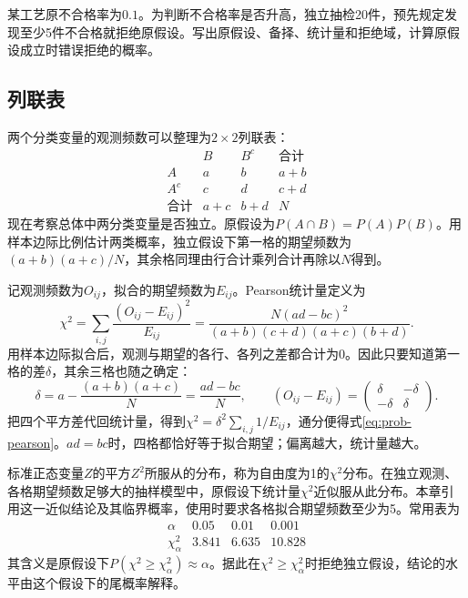 \begin{example}
某工艺原不合格率为\(0.1\)。为判断不合格率是否升高，独立抽检20件，预先规定发现至少5件不合格就拒绝原假设。写出原假设、备择、统计量和拒绝域，计算原假设成立时错误拒绝的概率。
\end{example}

\subsection{列联表}

两个分类变量的观测频数可以整理为\(2\times2\)列联表：
\[
\begin{array}{c|cc|c}
 & B&B^c&\text{合计}\\\hline
 A&a&b&a+b\\
 A^c&c&d&c+d\\\hline
 \text{合计}&a+c&b+d&N
\end{array}
\]
现在考察总体中两分类变量是否独立。原假设为\(P(A\cap B)=P(A)P(B)\)。用样本边际比例估计两类概率，独立假设下第一格的期望频数为\((a+b)(a+c)/N\)，其余格同理由行合计乘列合计再除以\(N\)得到。

记观测频数为\(O_{ij}\)，拟合的期望频数为\(E_{ij}\)。{\heiti Pearson统计量}定义为
\begin{equation}\label{eq:prob-pearson}
 \chi^2=\sum_{i,j}\frac{(O_{ij}-E_{ij})^2}{E_{ij}}
 =\frac{N(ad-bc)^2}{(a+b)(c+d)(a+c)(b+d)}.
\end{equation}
用样本边际拟合后，观测与期望的各行、各列之差都合计为0。因此只要知道第一格的差\(\delta\)，其余三格也随之确定：
\[
 \delta=a-\frac{(a+b)(a+c)}N=\frac{ad-bc}N,
 \qquad (O_{ij}-E_{ij})=
 \begin{pmatrix}\delta&-\delta\\-\delta&\delta\end{pmatrix}.
\]
把四个平方差代回统计量，得到\(\chi^2=\delta^2\sum_{i,j}1/E_{ij}\)，通分便得式\eqref{eq:prob-pearson}。\(ad=bc\)时，四格都恰好等于拟合期望；偏离越大，统计量越大。

标准正态变量\(Z\)的平方\(Z^2\)所服从的分布，称为自由度为1的\(\chi^2\)分布。在独立观测、各格期望频数足够大的抽样模型中，原假设下统计量\(\chi^2\)近似服从此分布。本章引用这一近似结论及其临界概率，使用时要求各格拟合期望频数至少为5。常用表为
\[
\begin{array}{c|ccc}
 \alpha&0.05&0.01&0.001\\\hline
 \chi^2_\alpha&3.841&6.635&10.828
\end{array}
\]
其含义是原假设下\(P(\chi^2\ge\chi^2_\alpha)\approx\alpha\)。据此在\(\chi^2\ge\chi^2_\alpha\)时拒绝独立假设，结论的水平由这个假设下的尾概率解释。

